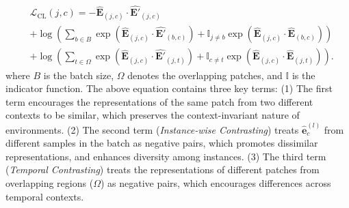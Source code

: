 {{\small
\begin{equation}
\label{Eq: CL}
\begin{aligned}
&\mathcal{L}_{\text{CL}}(j,c) = - \hat{\mathbf{E}}_{(j,c)} \cdot \hat{\mathbf{E}'}_{(j,c)}  \\
&+ \log \left( \sum_{b\in B} \exp \left( \hat{\mathbf{E}}_{(j,c)} \cdot \hat{\mathbf{E}'}_{(b,c)} \right) + \mathbb{I}_{j \neq b} \exp \left( \hat{\mathbf{E}}_{(j,c)} \cdot \hat{\mathbf{E}}_{(b,c)} \right) \right) \\
&+ \log \left( \sum_{t \in \Omega} \exp \left( \hat{\mathbf{E}}_{(j,c)} \cdot \hat{\mathbf{E}'}_{(j,t)} \right) + \mathbb{I}_{c \neq t} \exp \left( \hat{\mathbf{E}}_{(j,c)} \cdot \hat{\mathbf{E}}_{(j,t)} \right) \right). \nonumber
\end{aligned} 
\end{equation}}where $B$ is the batch size, $\Omega$ denotes the overlapping patches, and $\mathbb{I}$ is the indicator function.
The above equation contains three key terms: (1) The first term encourages the representations of the same patch from two different contexts to be similar, which preserves the context-invariant nature of environments. (2) The second term (\textit{Instance-wise Contrasting}) treats $\hat{\mathbf{e}}^{(l)}_c$ from different samples in the batch as negative pairs, which promotes dissimilar representations, and enhances diversity among instances. (3) The third term (\textit{Temporal Contrasting}) treats the representations of different patches from overlapping regions ($\Omega$) as negative pairs, which encourages differences across temporal contexts.
}
